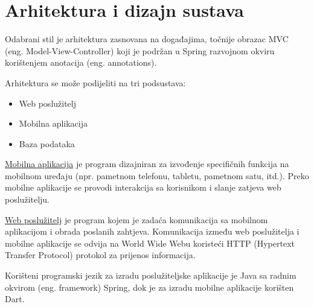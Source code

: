 \chapter{Arhitektura i dizajn sustava}
		


	Odabrani stil je arhitektura zasnovana na događajima, točnije obrazac MVC (eng. Model-View-Controller) koji je podržan u Spring razvojnom okviru korištenjem anotacija (eng. annotations).
	
	Arhitektura se može podijeliti na tri podsustava:
	\begin{itemize}
		\item Web poslužitelj
		\item Mobilna aplikacija
		\item Baza podataka
	\end{itemize}
	
	\underline{Mobilna aplikacija} je program dizajniran za izvođenje specifičnih funkcija na mobilnom uređaju (npr. pametnom telefonu, tabletu, pametnom satu, itd.). Preko mobilne aplikacije se provodi interakcija sa korisnikom i slanje zatjeva web poslužitelju.

	\underline {Web poslužitelj} je program kojem je zadaća komunikacija sa mobilnom aplikacijom i obrada poslanih zahtjeva. Komunikacija između web poslužitelja i mobilne aplikacije se odvija na World Wide Webu koristeći HTTP (Hypertext Transfer Protocol) protokol za prijenos informacija.
	
	Korišteni programski jezik za izradu poslužiteljske aplikacije je Java sa radnim okvirom (eng. framework) Spring, dok je za izradu mobilne aplikacije korišten Dart.
	
